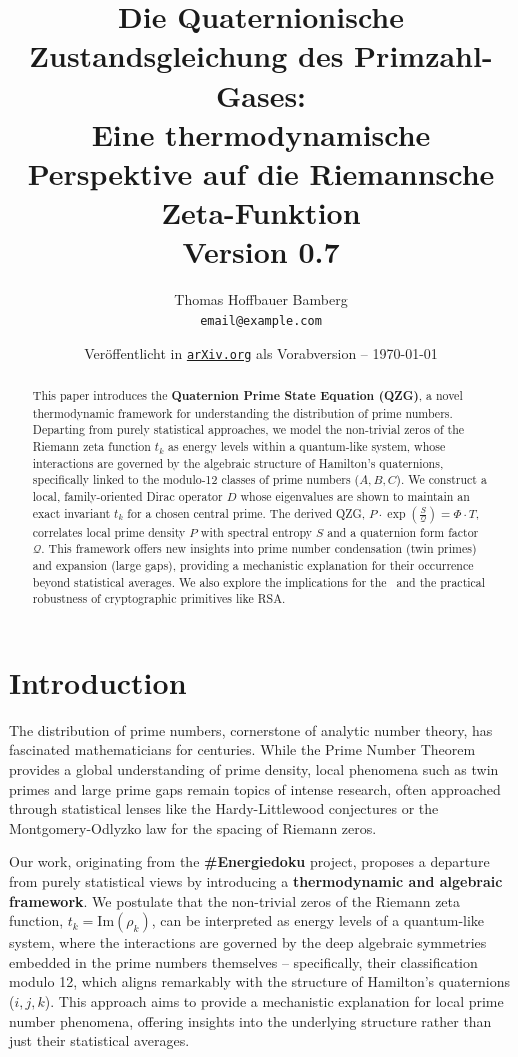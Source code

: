 \documentclass[11pt,a4paper]{article}
\title{Die Quaternionische Zustandsgleichung des Primzahl-Gases: \\ Eine thermodynamische Perspektive auf die Riemannsche Zeta-Funktion \\ \small Version 0.7}
\author{Thomas Hoffbauer \small  Bamberg \\ \small \texttt{email@example.com}}
\date{\small Veröffentlicht in \href{https://arxiv.org/}{\texttt{arXiv.org}} als Vorabversion -- \today}
\newcommand{\entropy}{S}
\newcommand{\formfactor}{\mathcal{Q}}
\newcommand{\pressure}{P}
\newcommand{\temperature}{T}
\newcommand{\bamberger}{\Phi}
\newcommand{\HilPol}{\text{Hilbert-Pólya-Hypothese}}
\theoremstyle{definition}
\begin{document}
\maketitle

\begin{abstract}
This paper introduces the \textbf{Quaternion Prime State Equation (QZG)}, a novel thermodynamic framework for understanding the distribution of prime numbers. Departing from purely statistical approaches, we model the non-trivial zeros of the Riemann zeta function $t_k$ as energy levels within a quantum-like system, whose interactions are governed by the algebraic structure of Hamilton's quaternions, specifically linked to the modulo-12 classes of prime numbers ($A, B, C$). We construct a local, family-oriented Dirac operator $D$ whose eigenvalues are shown to maintain an exact invariant $t_k$ for a chosen central prime. The derived QZG, $\pressure \cdot \exp\left(\frac{\entropy}{\formfactor}\right) = \bamberger \cdot \temperature$, correlates local prime density $\pressure$ with spectral entropy $\entropy$ and a quaternion form factor $\formfactor$. This framework offers new insights into prime number condensation (twin primes) and expansion (large gaps), providing a mechanistic explanation for their occurrence beyond statistical averages. We also explore the implications for the \HilPol\ and the practical robustness of cryptographic primitives like RSA.
\end{abstract}

\section{Introduction}
\label{sec:introduction}
The distribution of prime numbers, cornerstone of analytic number theory, has fascinated mathematicians for centuries. While the Prime Number Theorem provides a global understanding of prime density, local phenomena such as twin primes and large prime gaps remain topics of intense research, often approached through statistical lenses like the Hardy-Littlewood conjectures or the Montgomery-Odlyzko law for the spacing of Riemann zeros.

Our work, originating from the \textbf{\#Energiedoku} project, proposes a departure from purely statistical views by introducing a \textbf{thermodynamic and algebraic framework}. We postulate that the non-trivial zeros of the Riemann zeta function, $t_k = \text{Im}(\rho_k)$, can be interpreted as energy levels of a quantum-like system, where the interactions are governed by the deep algebraic symmetries embedded in the prime numbers themselves -- specifically, their classification modulo 12, which aligns remarkably with the structure of Hamilton's quaternions ($i, j, k$). This approach aims to provide a mechanistic explanation for local prime number phenomena, offering insights into the underlying structure rather than just their statistical averages.
\end{document}
